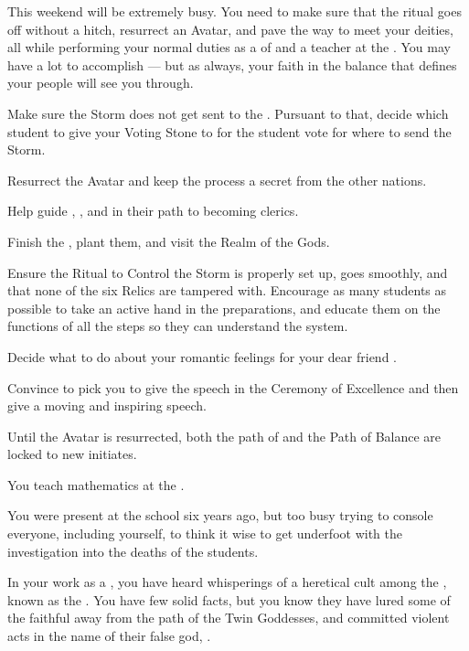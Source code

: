\documentclass[char]{GL2020}
\begin{document}
This weekend will be extremely busy. You need to make sure that the ritual goes off without a hitch, resurrect an Avatar, and pave the way to meet your deities, all while performing your normal duties as a \cFlowPriest{\cleric} of \cFlow{} and a teacher at the \pSchool{}. You may have a lot to accomplish — but as always, your faith in the balance that defines your people will see you through.

\begin{itemz}
    \item Make sure the Storm does not get sent to the \pShip{}. Pursuant to that, decide which student to give your Voting Stone to for the student vote for where to send the Storm.
    \item Resurrect the \cEbb{} Avatar and keep the process a secret from the other nations.
    \item Help guide \cInitiate{}, \cWarlordDaughter{}, and \cPirate{} in their path to becoming clerics.
    \item Finish the \iBeansMB{}, plant them, and visit the Realm of the Gods.
    \item Ensure the Ritual to Control the Storm is properly set up, goes smoothly, and that none of the six Relics are tampered with. Encourage as many students as possible to take an active hand in the preparations, and educate them on the functions of all the steps so they can understand the system.
    \item Decide what to do about your romantic feelings for your dear friend \cMusic{}.
    \item Convince \cMusic{} to pick you to give the speech in the Ceremony of Excellence and then give a moving and inspiring speech.
\end{itemz}

\begin{itemz}[Notes]
    \item Until the \cEbb{} Avatar is resurrected, both the path of \cEbb{} and the Path of Balance are locked to new initiates.
    \item You teach mathematics at the \pSchool{}.
    \item You were present at the school six years ago, but too busy trying to console everyone, including yourself, to think it wise to get underfoot with the investigation into the deaths of the students.
    \item In your work as a \cFlowPriest{\cleric}, you have heard whisperings of a heretical cult among the \pShip{}, known as the \pGoaties{}. You have few solid facts, but you know they have lured some of the faithful away from the path of the Twin Goddesses, and committed violent acts in the name of their false god, \cGenesis{}.
\end{itemz}
\end{document}
